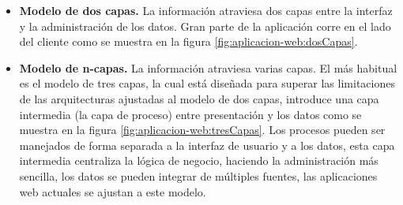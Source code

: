 \begin{itemize}
	\item \textbf{Modelo de dos capas.} La información atraviesa dos capas 
	entre la interfaz y la administración de los datos. Gran parte de la 
	aplicación corre en el lado del cliente como se muestra en la figura 
	\ref{fig:aplicacion-web:dosCapas}.


	\item \textbf{Modelo de n-capas.} La información atraviesa varias capas. 
	El más habitual es el modelo de tres capas, la cual está diseñada para 
	superar las limitaciones de las arquitecturas ajustadas al modelo de dos 
	capas, introduce una capa intermedia (la capa de proceso) entre 
	presentación y los datos como se muestra en la figura 
	\ref{fig:aplicacion-web:tresCapas}. Los procesos pueden ser manejados de 
	forma separada a la interfaz de usuario y a los datos, esta capa 
	intermedia centraliza la lógica de negocio, haciendo la administración 
	más sencilla, los datos se pueden integrar de múltiples fuentes, las 
	aplicaciones web actuales se ajustan a este modelo.


\end{itemize}

\newpage
